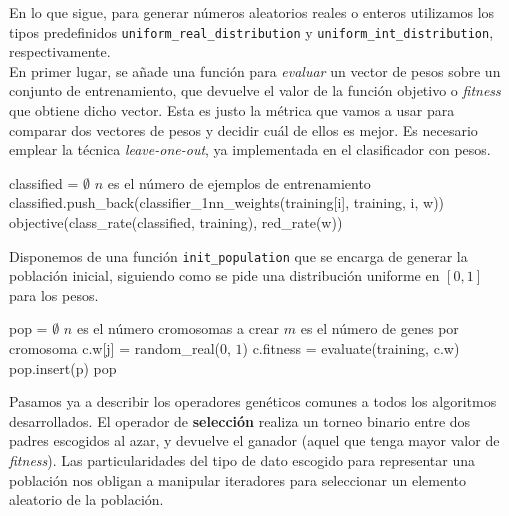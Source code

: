 \documentclass[12pt]{article}
\begin{document}
En lo que sigue, para generar números aleatorios reales o enteros utilizamos los tipos predefinidos \verb|uniform_real_distribution| y \verb|uniform_int_distribution|, respectivamente.\\

En primer lugar, se añade una función para \textit{evaluar} un vector de pesos sobre un conjunto de entrenamiento, que devuelve el valor de la función objetivo o \textit{fitness} que obtiene dicho vector. Esta es justo la métrica que vamos a usar para comparar dos vectores de pesos y decidir cuál de ellos es mejor. Es necesario emplear la técnica \textit{leave-one-out}, ya implementada en el clasificador con pesos.

\begin{algorithm}[ht]
\begin{algorithmic}

    \State classified = $\emptyset$
      \Comment $n$ es el número de ejemplos de entrenamiento
        \State classified.push\_back(classifier\_1nn\_weights(training[i], training, i, w))
    \EndFor  
\State \Return objective(class\_rate(classified, training), red\_rate(w))
\EndFunction

\end{algorithmic}
\end{algorithm}

Disponemos de una función \verb|init_population| que se encarga de generar la población inicial, siguiendo como se pide una distribución uniforme en $[0,1]$ para los pesos.\\

\begin{algorithm}[ht!]
\begin{algorithmic}

    \State pop = $\emptyset$
      \Comment $n$ es el número cromosomas a crear
          \Comment $m$ es el número de genes por cromosoma
            \State c.w[j] = random\_real($0$, $1$)
        \EndFor
        \State c.fitness = evaluate(training, c.w)
        \State pop.insert(p)
    \EndFor  
\State \Return pop
\EndFunction

\end{algorithmic}
\end{algorithm}

Pasamos ya a describir los operadores genéticos comunes a todos los algoritmos desarrollados. El operador de \textbf{selección} realiza un torneo binario entre dos padres escogidos al azar, y devuelve el ganador (aquel que tenga mayor valor de \textit{fitness}). Las particularidades del tipo de dato escogido para representar una población nos obligan a manipular iteradores para seleccionar un elemento aleatorio de la población.
\end{document}
